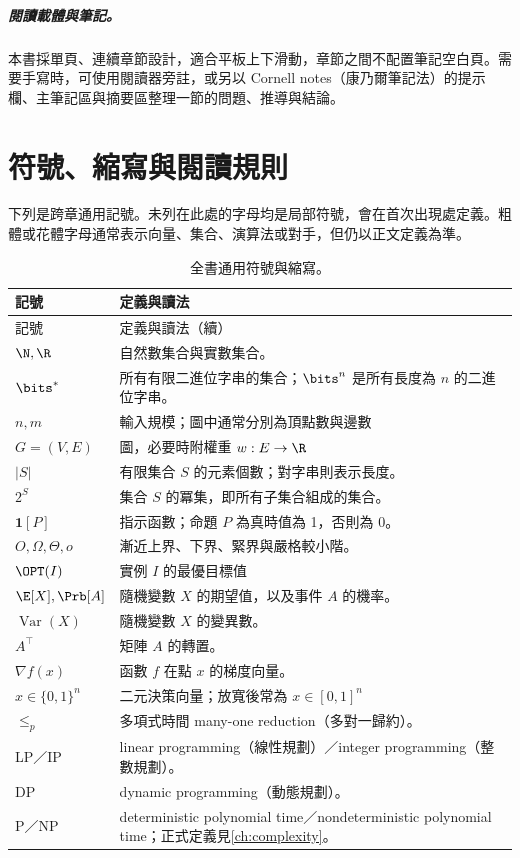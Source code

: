 \documentclass[11pt,a4paper,oneside,openany]{book}
\begin{document}
\paragraph{閱讀載體與筆記。}
本書採單頁、連續章節設計，適合平板上下滑動，章節之間不配置筆記空白頁。需要手寫時，可使用閱讀器旁註，或另以 Cornell notes（康乃爾筆記法）的提示欄、主筆記區與摘要區整理一節的問題、推導與結論。

\chapter*{符號、縮寫與閱讀規則}
下列是跨章通用記號。未列在此處的字母均是局部符號，會在首次出現處定義。粗體或花體字母通常表示向量、集合、演算法或對手，但仍以正文定義為準。

\begin{longtable}{@{}p{}p{}@{}}
\caption{全書通用符號與縮寫。}\label{tab:notation}\\
\toprule
記號 & 定義與讀法 \\
\midrule
\endfirsthead
\toprule
記號 & 定義與讀法（續） \\
\midrule
\endhead
$\N,\R$ & 自然數集合與實數集合。 \\
$\bits^*$ & 所有有限二進位字串的集合；$\bits^n$ 是所有長度為 $n$ 的二進位字串。 \\
$n,m$ & 輸入規模；圖中通常分別為頂點數與邊數 \\
$G=(V,E)$ & 圖，必要時附權重 $w:E\to\R$ \\
$|S|$ & 有限集合 $S$ 的元素個數；對字串則表示長度。 \\
$2^S$ & 集合 $S$ 的冪集，即所有子集合組成的集合。 \\
$\mathbf 1[P]$ & 指示函數；命題 $P$ 為真時值為 1，否則為 0。 \\
$O,\Omega,\Theta,o$ & 漸近上界、下界、緊界與嚴格較小階。 \\
$\OPT(I)$ & 實例 $I$ 的最優目標值 \\
$\E[X],\Prb[A]$ & 隨機變數 $X$ 的期望值，以及事件 $A$ 的機率。 \\
$\operatorname{Var}(X)$ & 隨機變數 $X$ 的變異數。 \\
$A^\top$ & 矩陣 $A$ 的轉置。 \\
$\nabla f(x)$ & 函數 $f$ 在點 $x$ 的梯度向量。 \\
$x\in\{0,1\}^n$ & 二元決策向量；放寬後常為 $x\in[0,1]^n$ \\
$\le_p$ & 多項式時間 many-one reduction（多對一歸約）。 \\
LP／IP & linear programming（線性規劃）／integer programming（整數規劃）。 \\
DP & dynamic programming（動態規劃）。 \\
P／NP & deterministic polynomial time／nondeterministic polynomial time；正式定義見\cref{ch:complexity}。 \\
\bottomrule
\end{longtable}
\end{document}
